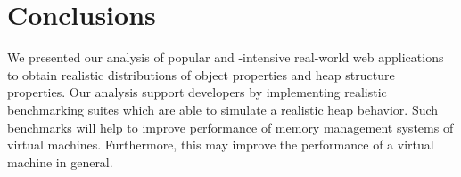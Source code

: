 
\section{Conclusions}

We presented our analysis of popular and \JS-intensive real-world web
applications to obtain realistic distributions of object properties and heap
structure properties. Our analysis support developers by implementing realistic
\JS benchmarking suites which are able to simulate a realistic \JS heap
behavior. Such benchmarks will help to improve performance of memory management
systems of \JS virtual machines. Furthermore, this may improve the
performance of a \JS virtual machine in general.